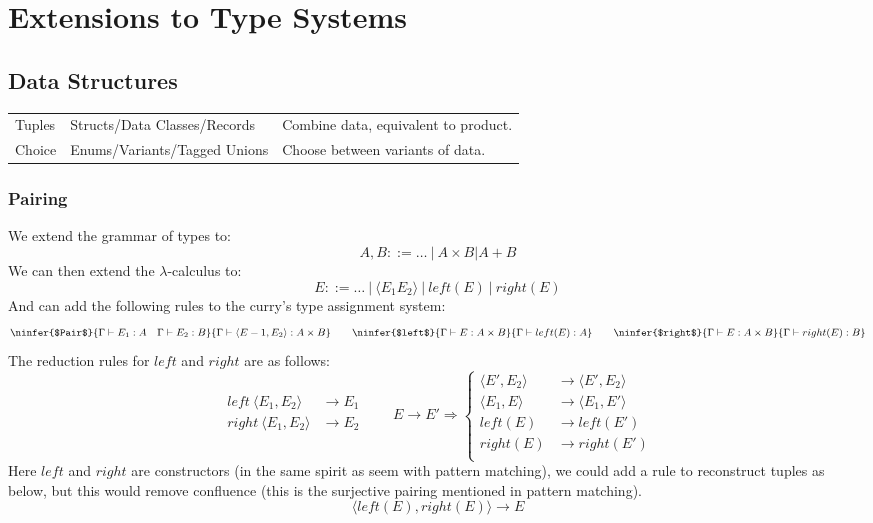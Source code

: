 \chapter{Extensions to Type Systems}

\section{Data Structures}
\begin{tabular}{l l l}
	Tuples & Structs/Data Classes/Records & Combine data, equivalent to product. \\
	Choice & Enums/Variants/Tagged Unions & Choose between variants of data.     \\
\end{tabular}
\subsection{Pairing}
We extend the grammar of types to:
\[A, B ::= \dots \ | \ A \times B | A + B\]
We can then extend the $\lambda$-calculus to:
\[E ::= \dots \ | \ \langle E_1 E_2 \rangle \ | \ left (E) \ | \ right(E) \]
And can add the following rules to the curry's type assignment system:
\[\ninfer{$Pair$}{\Gamma \vdash E_1 : A \quad \Gamma \vdash E_2 : B}{\Gamma \vdash \langle E-1, E_2 \rangle : A \times B}
	\qquad \ninfer{$left$}{\Gamma \vdash E : A \times B}{\Gamma \vdash left (E) : A}
	\qquad \ninfer{$right$}{\Gamma \vdash E : A \times B}{\Gamma \vdash right (E) : B}\]
The reduction rules for $left$ and $right$ are as follows:
\[\begin{split}
		left \ \langle E_1, E_2 \rangle & \to E_1 \\
		right \ \langle E_1, E_2 \rangle & \to E_2 \\
	\end{split} \qquad
	E \to E' \Rightarrow \begin{cases}
		\langle E', E_2 \rangle & \to \langle E', E_2 \rangle \\
		\langle E_1, E \rangle  & \to \langle E_1, E' \rangle \\
		left (E)                & \to left (E')               \\
		right (E)               & \to right (E')              \\
	\end{cases}\]
Here $left$ and $right$ are constructors (in the same spirit as seem with pattern matching), we could add a rule to reconstruct tuples as below, but this would remove confluence (this is the surjective pairing mentioned in pattern matching).
\[\langle left(E), right(E) \rangle \to E\]

